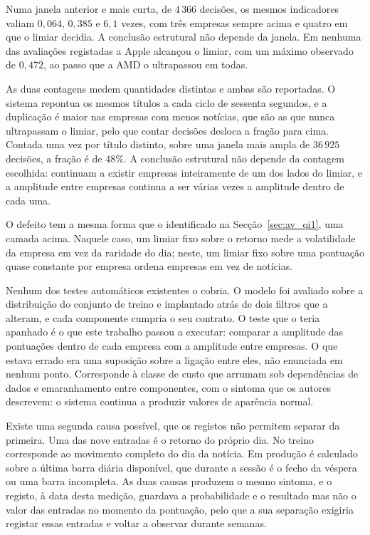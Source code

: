 Numa janela anterior e mais curta, de $4\,366$ decisões, os mesmos
indicadores valiam $0{,}064$, $0{,}385$ e $6{,}1$ vezes, com três empresas sempre acima e quatro em
que o limiar decidia. A conclusão estrutural não depende da janela. Em nenhuma das avaliações
registadas a Apple alcançou o limiar, com um máximo observado de $0{,}472$, ao passo que a AMD o
ultrapassou em todas.

As duas contagens medem quantidades distintas e ambas são reportadas. O sistema repontua os mesmos
títulos a cada ciclo de sessenta segundos, e a duplicação é maior nas empresas com menos notícias,
que são as que nunca ultrapassam o limiar, pelo que contar decisões desloca a fração para cima.
Contada uma vez por título distinto, sobre uma janela mais ampla de $36\,925$ decisões, a fração é de
$48\%$. A conclusão estrutural não depende da contagem escolhida: continuam a existir empresas
inteiramente de um dos lados do limiar, e a amplitude entre empresas continua a ser várias vezes a
amplitude dentro de cada uma.

O defeito tem a mesma forma que o identificado na Secção~\ref{sec:av_qi1}, uma camada acima. Naquele
caso, um limiar fixo sobre o retorno mede a volatilidade da empresa em vez da raridade do dia; neste,
um limiar fixo sobre uma pontuação quase constante por empresa ordena empresas em vez de notícias.

Nenhum dos testes automáticos existentes o cobria. O modelo foi avaliado sobre a distribuição do
conjunto de treino e implantado atrás de dois filtros que a alteram, e cada componente cumpria o seu
contrato. O teste que o teria apanhado é o que este trabalho passou a executar: comparar a amplitude
das pontuações dentro de cada empresa com a amplitude entre empresas. O
que estava errado era uma suposição sobre a ligação entre eles, não enunciada em nenhum ponto.
Corresponde à classe de custo que \textcite{sculley2015debt} arrumam sob dependências de dados e
emaranhamento entre componentes, com o sintoma que os autores descrevem: o sistema continua a
produzir valores de aparência normal.

Existe uma segunda causa possível, que os registos não permitem separar da primeira. Uma das nove entradas é o retorno do próprio dia. No treino corresponde ao movimento completo do
dia da notícia. Em produção é calculado sobre a última barra diária disponível, que durante a
sessão é o fecho da véspera ou uma barra incompleta. As duas causas produzem o mesmo sintoma, e
o registo, à data desta medição, guardava a probabilidade e o resultado mas não o valor das
entradas no momento da pontuação, pelo que a sua separação exigiria registar essas entradas e
voltar a observar durante semanas.

